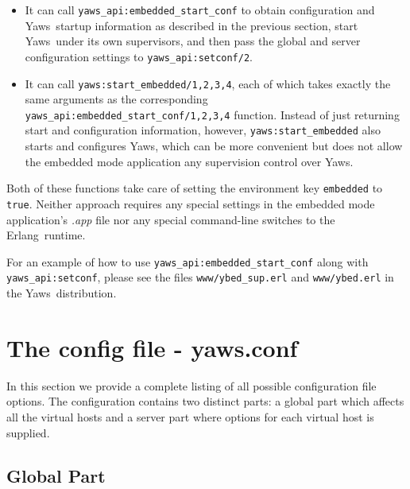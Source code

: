 \documentclass[11pt,oneside,english]{book}
\newcommand{\Erlang}            %
        {{\sc Erlang}}
\newcommand{\Yaws}            %
        {{\sc Yaws}}
\begin{document}
\begin{itemize}

\item It can call \verb+yaws_api:embedded_start_conf+ to obtain
  configuration and \Yaws\  startup information as described in the
  previous section, start \Yaws\  under its own supervisors, and then
  pass the global and server configuration settings to
  \verb+yaws_api:setconf/2+.

\item It can call \verb+yaws:start_embedded/1,2,3,4+, each of which
  takes exactly the same arguments as the corresponding
  \verb+yaws_api:embedded_start_conf/1,2,3,4+ function. Instead of just
  returning start and configuration information, however,
  \verb+yaws:start_embedded+ also starts and configures \Yaws{}, which
  can be more convenient but does not allow the embedded mode
  application any supervision control over \Yaws{}.

\end{itemize}

Both of these functions take care of setting the environment key
\verb+embedded+ to \verb+true+. Neither approach requires any special
settings in the embedded mode application's \textit{.app} file nor any
special command-line switches to the \Erlang\  runtime.

For an example of how to use \verb+yaws_api:embedded_start_conf+ along
with \verb+yaws_api:setconf+, please see the files
\verb+www/ybed_sup.erl+ and \verb+www/ybed.erl+ in the
\Yaws\  distribution.

\chapter{The config file - yaws.conf}

In this section we provide a complete listing of all possible
configuration file options.  The configuration contains two distinct
parts: a global part which affects all the virtual hosts and a server
part where options for each virtual host is supplied.

\section{Global Part}
\end{document}
